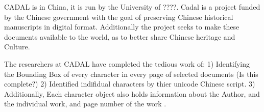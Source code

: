 CADAL is in China, it is run by the University of ????.  Cadal is a project funded by the Chinese government with the goal of preserving Chinese historical manuscripts in digital format.  Additionally the project seeks to make these documents available to the world, as to better share Chinese heritage and Culture.

The researchers at CADAL have completed the tedious work of:
1) Identifying the Bounding Box of every character in every page of selected documents (Is this complete?)
2) Identified indifidual characters by thier unicode Chinese script.
3) Additionally, Each character object also holds information about the Author, and the individual work, and page number of the work .


